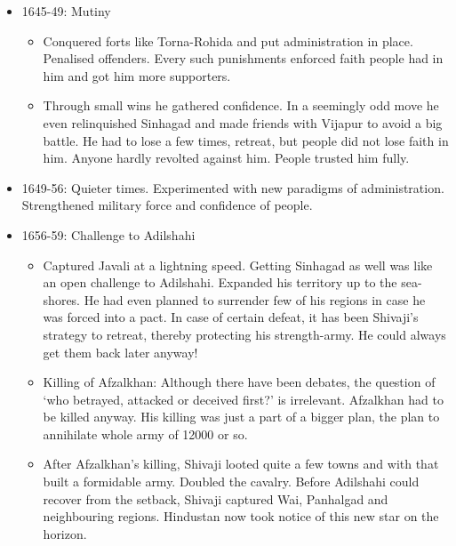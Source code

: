 \begin{itemize}
\item 1645-49: Mutiny
	\begin{itemize}
	\item Conquered forts like Torna-Rohida and put administration in place. Penalised offenders. Every such punishments enforced faith people had in him and got him more supporters.
	\item Through small wins he gathered confidence. In a seemingly odd move he even relinquished Sinhagad and made friends with Vijapur to avoid a big battle. He had to lose a few times, retreat, but people did not lose faith in him. Anyone hardly revolted against him. People trusted him fully.
	\end{itemize}

\item 1649-56: Quieter times. Experimented with new paradigms of administration. Strengthened military force and confidence of people.

\item 1656-59: Challenge to Adilshahi
	\begin{itemize}
	\item Captured  Javali at a lightning speed.  Getting Sinhagad as well was like an open challenge to Adilshahi. Expanded his territory up to the sea-shores. He had even planned to surrender few of his regions in case he was forced into a pact. In case of certain defeat, it has been Shivaji’s strategy to retreat, thereby protecting his strength-army. He could always get them back later anyway!
	\item Killing of Afzalkhan: Although there have been debates, the question of ‘who betrayed, attacked or deceived first?’ is irrelevant. Afzalkhan had to be killed anyway. His killing was just a part of a bigger plan, the plan to annihilate whole army of 12000 or so.
	\item After Afzalkhan’s killing, Shivaji looted quite a few towns and with that built a formidable army. Doubled the cavalry. Before Adilshahi could recover from the setback, Shivaji captured Wai, Panhalgad and neighbouring regions. Hindustan now took notice of this new star on the horizon.
	\end{itemize}


\end{itemize}
